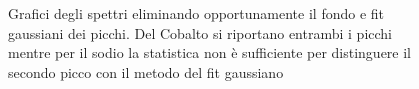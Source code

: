 \documentclass[a4paper]{article}
\begin{document}
\begin{figure}[H]
    \qquad
    \qquad
    \qquad
    \qquad
    \qquad
   \caption{Grafici degli spettri eliminando opportunamente il fondo e fit gaussiani dei picchi. Del Cobalto si riportano entrambi i picchi mentre per il sodio la statistica non è sufficiente per distinguere il secondo picco con il metodo del fit gaussiano}%
    \label{fig:1}%
\end{figure}
\end{document}
